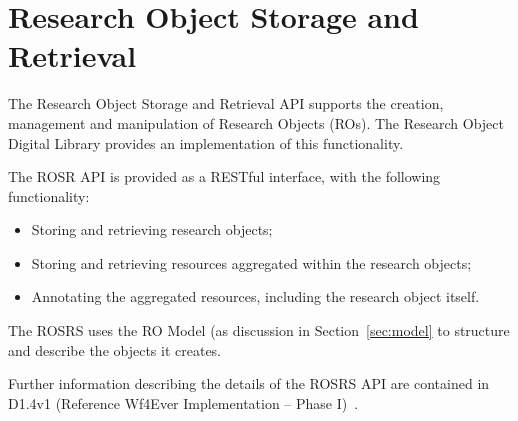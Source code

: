\section{Research Object Storage and Retrieval}
\label{sec:rosrs}

The Research Object Storage and Retrieval API supports the creation,
management and manipulation of Research Objects (ROs). The Research
Object Digital Library provides an implementation of this
functionality. 

The ROSR API is provided as a RESTful interface, with the following functionality:

\begin{itemize}
\item Storing and retrieving research objects;
\item Storing and retrieving resources aggregated within the research objects;
\item Annotating the aggregated resources, including the research object itself. 
\end{itemize}

The ROSRS uses the RO Model (as discussion in Section~\ref{sec:model} to structure and describe the objects it creates. 

Further information describing the details of the ROSRS API are
contained in D1.4v1 (Reference Wf4Ever Implementation -- Phase I)~\cite{D1.4v1}.


